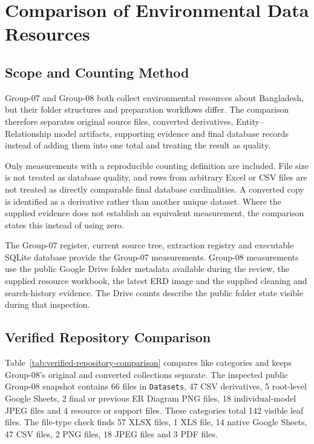 \section{Comparison of Environmental Data Resources}
\label{sec:comparison}

\subsection{Scope and Counting Method}
\label{subsec:comparison-scope-method}

Group-07 and Group-08 both collect environmental resources about Bangladesh,
but their folder structures and preparation workflows differ. The comparison
therefore separates original source files, converted derivatives,
Entity--Relationship model artifacts, supporting evidence and final database
records instead of adding them into one total and treating the result as
quality.

Only measurements with a reproducible counting definition are included. File
size is not treated as database quality, and rows from arbitrary Excel or CSV
files are not treated as directly comparable final database cardinalities. A
converted copy is identified as a derivative rather than another unique
dataset. Where the supplied evidence does not establish an equivalent
measurement, the comparison states this instead of using zero.

The Group-07 register, current source tree, extraction registry and executable
SQLite database provide the Group-07 measurements. Group-08 measurements use
the public Google Drive folder metadata available during the review, the
supplied resource workbook, the latest ERD image and the supplied cleaning and
search-history evidence. The Drive counts describe the public folder state
visible during that inspection.

\subsection{Verified Repository Comparison}
\label{subsec:verified-repository-comparison}

Table~\ref{tab:verified-repository-comparison} compares like categories and
keeps Group-08's original and converted collections separate. The inspected
public Group-08 snapshot contains 66 files in \texttt{Datasets}, 47 CSV
derivatives, 5 root-level Google Sheets, 2 final or previous ER Diagram PNG
files, 18 individual-model JPEG files and 4 resource or support files. These
categories total 142 visible leaf files. The file-type check finds 57 XLSX
files, 1 XLS file, 14 native Google Sheets, 47 CSV files, 2 PNG files, 18 JPEG
files and 3 PDF files.

